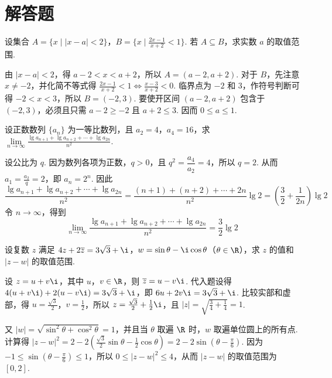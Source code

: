 \documentclass[UTF8,a4paper,oneside,11pt]{ctexbook}
\begin{document}
\section{解答题}

\begin{problem}
设集合 \(A = \{x\mid |x - a| < 2\}\)，\(B = \{x\mid \frac{2x - 1}{x + 2} < 1\}\). 若 \(A \subseteq B\)，求实数 \(a\) 的取值范围.
\end{problem}

\begin{solution}
由 \(|x-a|<2\)，得 \(a-2<x<a+2\)，所以 \(A=(a-2,a+2)\). 对于 \(B\)，先注意 \(x\ne-2\)，并化简不等式得
\(\frac{2x-1}{x+2}<1\Longleftrightarrow\frac{x-3}{x+2}<0\). 临界点为 \(-2\) 和 \(3\)，作符号判断可得 \(-2<x<3\)，所以 \(B=(-2,3)\). 要使开区间 \((a-2,a+2)\) 包含于 \((-2,3)\)，必须且只需 \(a-2\geq-2\) 且 \(a+2\leq3\). 因而 \(0\leq a\leq1\).
\end{solution}

\begin{problem}
设正数数列 \(\{a_{n}\} \) 为一等比数列，且 \(a_{2}=4\)，\(a_{4}=16\)，求 \(\displaystyle\lim\limits_{n\to\infty}\frac{\lg a_{n+1}+\lg a_{n+2}+\cdots+\lg a_{2n}}{n^{2}} \).
\end{problem}

\begin{solution}
设公比为 \(q\). 因为数列各项为正数，\(q>0\)，且 \(q^{2}=\dfrac{a_{4}}{a_{2}}=4\)，所以 \(q=2\). 从而 \(a_{1}=\frac{a_{2}}{q}=2\)，即 \(a_n=2^n\). 因此
\[
\frac{\lg a_{n+1}+\lg a_{n+2}+\cdots+\lg a_{2n}}{n^2}=\frac{(n+1)+(n+2)+\cdots+2n}{n^2}\lg2=\left(\frac32+\frac{1}{2n}\right)\lg2
\]
令 \(n\to\infty\)，得到
\[
\displaystyle\lim_{n\to\infty}\frac{\lg a_{n+1}+\lg a_{n+2}+\cdots+\lg a_{2n}}{n^2}=\frac32\lg2
\]
\end{solution}

\begin{problem}
设复数 \(z\) 满足 \(4z + 2\overline{z} = 3\sqrt{3} + \i\)，\(w = \sin\theta - \i\cos\theta\)（\(\theta \in \R\)），求 \(z\) 的值和 \(|z - w| \) 的取值范围.
\end{problem}

\begin{solution}
设 \(z=u+v\i\)，其中 \(u\)，\(v\in\R\)，则 \(\overline z=u-v\i\). 代入题设得
\(4(u+v\i)+2(u-v\i)=3\sqrt3+\i\)，即 \(6u+2v\i=3\sqrt3+\i\). 比较实部和虚部，得 \(u=\frac{\sqrt3}{2}\)，\(v=\frac12\)，所以
\(z=\frac{\sqrt3}{2}+\frac12\i\)，且 \(|z|=\sqrt{\frac34+\frac14}=1\).

又 \(|w|=\sqrt{\sin^2\theta+\cos^2\theta}=1\)，并且当 \(\theta\) 取遍 \(\R\) 时，\(w\) 取遍单位圆上的所有点. 计算得
\(|z-w|^2=2-2\left(\frac{\sqrt3}{2}\sin\theta-\frac12\cos\theta\right)=2-2\sin\left(\theta-\frac{\pi}{6}\right)\). 因为 \(-1\leqslant\sin\left(\theta-\frac{\pi}{6}\right)\leqslant1\)，所以 \(0\leqslant|z-w|^2\leqslant4\)，从而 \(|z-w|\) 的取值范围为 \([0,2]\).
\end{solution}
\end{document}
